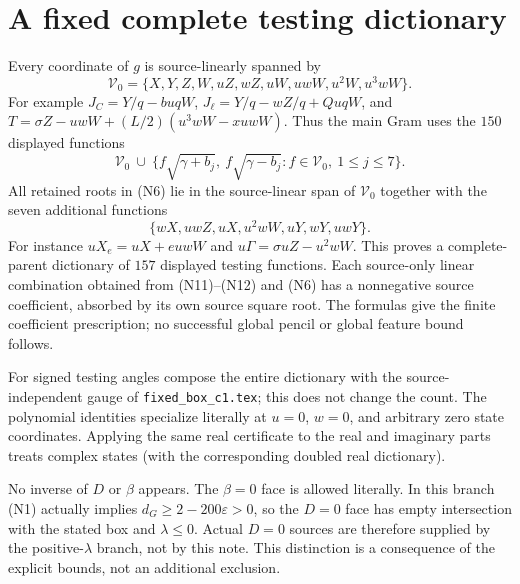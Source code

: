 \documentclass[11pt]{article}
\newcommand{\eps}{\varepsilon}
\begin{document}
\section{A fixed complete testing dictionary}

Every coordinate of $g$ is source-linearly spanned by
\[
 \mathcal V_0=\{X,Y,Z,W,uZ,wZ,uW,uwW,u^2W,u^3wW\}.       \tag{N13}
\]
For example $J_C=Y/q-buqW$, $J_\ell=Y/q-wZ/q+QuqW$,
and $T=\sigma Z-uwW+(L/2)(u^3wW-xuwW)$.
Thus the main Gram uses the $150$ displayed functions
\[
 \mathcal V_0\ \cup\
 \{f\sqrt{\gamma+b_j},\ f\sqrt{\gamma-b_j}:
                         f\in\mathcal V_0,\ 1\le j\le7\}.      \tag{N14}
\]
All retained roots in (N6) lie in the source-linear span of
$\mathcal V_0$ together with the seven additional functions
\[
       \{wX,uwZ,uX,u^2wW,uY,wY,uwY\}.                     \tag{N15}
\]
For instance $uX_e=uX+euwW$ and
$u\Gamma=\sigma uZ-u^2wW$. This proves a complete-parent
dictionary of $157$ displayed testing functions. Each source-only
linear combination obtained from (N11)--(N12) and (N6) has a
nonnegative source coefficient, absorbed by its own source square
root. The formulas give the finite coefficient prescription; no
successful global pencil or global feature bound follows.

For signed testing angles compose the entire dictionary with the
source-independent gauge of \texttt{fixed\_box\_c1.tex}; this does
not change the count. The polynomial identities specialize literally
at $u=0$, $w=0$, and arbitrary zero state coordinates. Applying
the same real certificate to the real and imaginary parts treats
complex states (with the corresponding doubled real dictionary).

No inverse of $D$ or $\beta$ appears. The $\beta=0$ face is allowed
literally. In this branch (N1) actually implies
$d_G\ge2-200\eps>0$, so the $D=0$ face has empty intersection
with the stated box and $\lambda\le0$. Actual $D=0$ sources are
therefore supplied by the positive-$\lambda$ branch, not by this note.
This distinction is a consequence of the explicit bounds, not an
additional exclusion.
\end{document}
